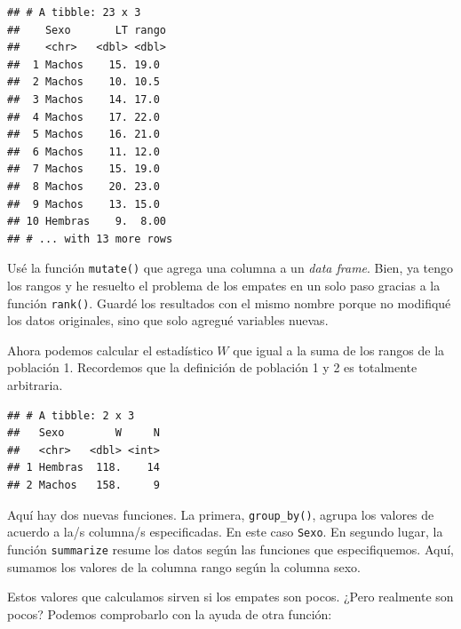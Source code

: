\documentclass[]{book}
\newenvironment{Shaded}{\begin{snugshade}}{\end{snugshade}}
\newcommand{\DataTypeTok}[1]{\textcolor[rgb]{0.13,0.29,0.53}{#1}}
\newcommand{\DecValTok}[1]{\textcolor[rgb]{0.00,0.00,0.81}{#1}}
\newcommand{\KeywordTok}[1]{\textcolor[rgb]{0.13,0.29,0.53}{\textbf{#1}}}
\newcommand{\NormalTok}[1]{#1}
\newcommand{\OperatorTok}[1]{\textcolor[rgb]{0.81,0.36,0.00}{\textbf{#1}}}
\newcommand{\StringTok}[1]{\textcolor[rgb]{0.31,0.60,0.02}{#1}}
\theoremstyle{definition}
\theoremstyle{definition}
\theoremstyle{definition}
\theoremstyle{remark}
\begin{document}
\begin{verbatim}
## # A tibble: 23 x 3
##    Sexo       LT rango
##    <chr>   <dbl> <dbl>
##  1 Machos    15. 19.0 
##  2 Machos    10. 10.5 
##  3 Machos    14. 17.0 
##  4 Machos    17. 22.0 
##  5 Machos    16. 21.0 
##  6 Machos    11. 12.0 
##  7 Machos    15. 19.0 
##  8 Machos    20. 23.0 
##  9 Machos    13. 15.0 
## 10 Hembras    9.  8.00
## # ... with 13 more rows
\end{verbatim}

Usé la función \texttt{mutate()} que agrega una columna a un \emph{data
frame}. Bien, ya tengo los rangos y he resuelto el problema de los
empates en un solo paso gracias a la función \texttt{rank()}. Guardé los
resultados con el mismo nombre porque no modifiqué los datos originales,
sino que solo agregué variables nuevas.

Ahora podemos calcular el estadístico \(W\) que igual a la suma de los
rangos de la población 1. Recordemos que la definición de población 1 y
2 es totalmente arbitraria.

\begin{Shaded}
\end{Shaded}

\begin{verbatim}
## # A tibble: 2 x 3
##   Sexo        W     N
##   <chr>   <dbl> <int>
## 1 Hembras  118.    14
## 2 Machos   158.     9
\end{verbatim}

Aquí hay dos nuevas funciones. La primera, \texttt{group\_by()}, agrupa
los valores de acuerdo a la/s columna/s especificadas. En este caso
\texttt{Sexo}. En segundo lugar, la función \texttt{summarize} resume
los datos según las funciones que especifiquemos. Aquí, sumamos los
valores de la columna rango según la columna sexo.

Estos valores que calculamos sirven si los empates son pocos. ¿Pero
realmente son pocos? Podemos comprobarlo con la ayuda de otra función:

\begin{Shaded}
\end{Shaded}
\end{document}
